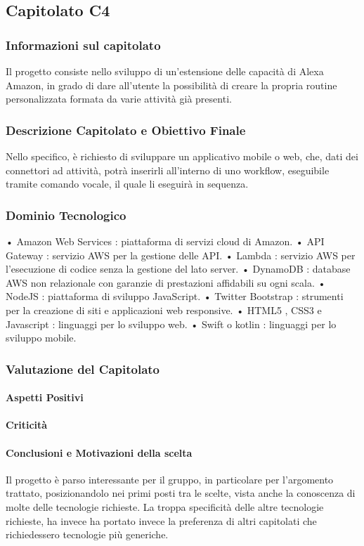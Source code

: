 \subsection{Capitolato C4}

\subsubsection{Informazioni sul capitolato}
Il progetto consiste nello sviluppo di un’estensione delle capacità di Alexa Amazon, in grado di dare all’utente la possibilità di creare la propria routine personalizzata formata da varie attività già presenti.
\subsubsection{Descrizione Capitolato e Obiettivo Finale}
Nello specifico, è richiesto di sviluppare un applicativo mobile o web, che, dati dei connettori ad attività, potrà inserirli all’interno di uno workflow, eseguibile tramite comando vocale, il quale li eseguirà in sequenza.
\subsubsection{Dominio Tecnologico}
•	Amazon Web Services : piattaforma di servizi cloud di Amazon.
•	API Gateway : servizio AWS per la gestione delle API.
•	Lambda :  servizio AWS per l’esecuzione di codice senza la gestione del lato server.
•	DynamoDB : database AWS non relazionale con garanzie di prestazioni affidabili su ogni scala.
•	NodeJS : piattaforma di sviluppo JavaScript.
•	Twitter Bootstrap : strumenti per la creazione di siti e applicazioni web responsive.
•	HTML5 , CSS3 e Javascript : linguaggi per lo sviluppo web.
•	Swift o kotlin : linguaggi per lo sviluppo mobile.	

\subsubsection{Valutazione del Capitolato}

\paragraph{Aspetti Positivi}

\paragraph{Criticità}

\paragraph{Conclusioni e Motivazioni della scelta}
Il progetto è parso interessante per il gruppo, in particolare per l’argomento trattato, posizionandolo nei primi posti tra le scelte, vista anche la conoscenza di molte delle tecnologie richieste. La troppa specificità delle altre tecnologie richieste, ha invece ha portato invece la preferenza di altri capitolati che richiedessero tecnologie più generiche.